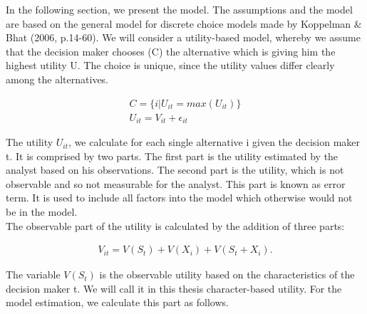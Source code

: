 \documentclass[12pt,dvipsnames]{article}%
\begin{document}

In the following section, we present the model. The assumptions and the model are based on the general model for discrete choice models made by Koppelman \& Bhat (2006, p.14-60). We will consider a utility-based model, whereby we assume that the decision maker chooses (C) the alternative which is giving him the highest utility U. The choice is unique, since the utility values differ clearly among the alternatives.

\vspace{-1.5cm}
 
\begin{center}
\begin{align}
 C = \{ i | U_{it} = max(U_{it}) \} \\
 U_{it} = V_{it} + \epsilon_{it} \label{eq:test2}
\end{align}
\end{center}

\vspace{-0.5cm}

The utility $U_{it}$, we calculate for each single alternative i given the decision maker t. It is comprised by two parts. The first part is the utility estimated by the analyst based on his observations. The second part is the utility, which is not observable and so not measurable for the analyst. This part is known as error term. It is used to include all factors into the model which otherwise would not be in the model. \\
%
The observable part of the utility is calculated by the addition of three parts:

\vspace{-1.2cm}

\begin{center}
\begin{align}
V_{it} = V(S_t) + V(X_i) + V(S_t+X_i). \label{eq:test3}
\end{align}
\end{center}

The variable $V(S_t)$ is the observable utility based on the characteristics of the decision maker t. We will call it in this thesis character-based utility. For the model estimation, we calculate this part as follows. 

\vspace{-1.2cm}
\end{document}
